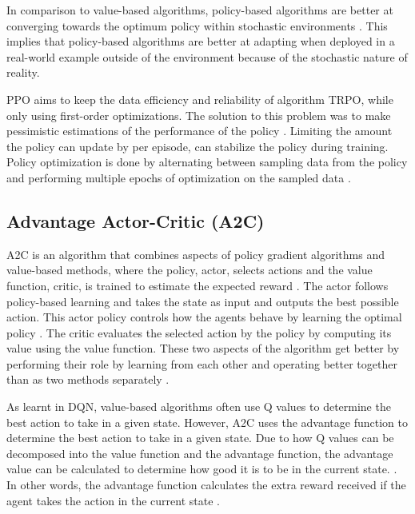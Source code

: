 In comparison to value-based algorithms, policy-based algorithms are better at converging towards the optimum policy within stochastic environments \cite{mnih2015human}. This implies that policy-based algorithms are better at adapting when deployed in a real-world example outside of the environment because of the stochastic nature of reality. 

PPO aims to keep the data efficiency and reliability of algorithm TRPO, while only using first-order optimizations. The solution to this problem was to make pessimistic estimations of the performance of the policy \cite{schulman2017proximal}. Limiting the amount the policy can update by per episode, can stabilize the policy during training. Policy optimization is done by alternating between sampling data from the policy and performing multiple epochs of optimization on the sampled data \cite{schulman2017proximal}. 

\subsection{Advantage Actor-Critic (A2C)}

A2C is an algorithm that combines aspects of policy gradient algorithms and value-based methods, where the policy, actor, selects actions and the value function, critic, is trained to estimate the expected reward \cite{mnih2013playing}. The actor follows policy-based learning and takes the state as input and outputs the best possible action. This actor policy controls how the agents behave by learning the optimal policy \cite{SergiosKaragiannakos2018}. The critic evaluates the selected action by the policy by computing its value using the value function. These two aspects of the algorithm get better by performing their role by learning from each other and operating better together than as two methods separately \cite{SergiosKaragiannakos2018}. 

As learnt in DQN, value-based algorithms often use Q values to determine the best action to take in a given state. However, A2C uses the advantage function to determine the best action to take in a given state. Due to how Q values can be decomposed into the value function and the advantage function, the advantage value can be calculated to determine how good it is to be in the current state. \cite{SergiosKaragiannakos2018}. In other words, the advantage function calculates the extra reward received if the agent takes the action in the current state \cite{ThomasSimonini2022A2C}.

